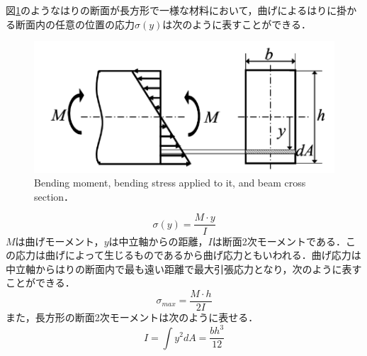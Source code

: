 図\ref{fig:曲げモーメント断面}のようなはりの断面が長方形で一様な材料において，曲げによるはりに掛かる断面内の任意の位置の応力$\sigma (y)$は次のように表すことができる．
\begin{figure}[htbp]
    \centering %
    \includegraphics[width=100truemm,clip]{fig/fig_曲げ.png}
    \caption{Bending moment, bending stress applied to it, and beam cross section．}
    \label{fig:曲げモーメント断面}
\end{figure}
\begin{equation}
    \sigma (y) = \frac{M \cdot y}{I}
\end{equation}
$M$は曲げモーメント，$y$は中立軸からの距離，$I$は断面2次モーメントである．この応力は曲げによって生じるものであるから曲げ応力ともいわれる．曲げ応力は中立軸からはりの断面内で最も遠い距離で最大引張応力となり，次のように表すことができる．
\begin{equation}
   \sigma_{max} = \frac{M \cdot h}{2I}
\end{equation}
また，長方形の断面2次モーメントは次のように表せる．
\begin{equation}
    I = \int y^2dA = \frac{bh^3}{12}
\end{equation}

